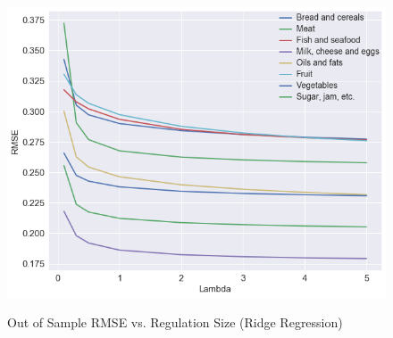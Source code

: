 \documentclass[11pt]{article}
\begin{document}
\begin{figure}[b]
    \centering
        \caption{Out of Sample RMSE vs. Regulation Size (Ridge Regression)}
    \includegraphics[scale=.65]{lambda.png}
    \label{Figure 3}
\end{figure}
\end{document}
